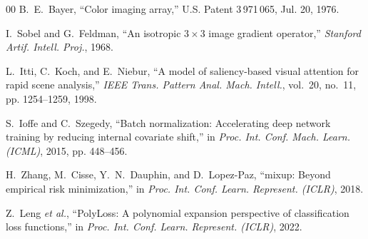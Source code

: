 \documentclass[conference]{IEEEtran}
\begin{document}
\begin{thebibliography}{00}
B.~E.~Bayer, ``Color imaging array,'' U.S. Patent 3\,971\,065, Jul. 20, 1976.

I.~Sobel and G.~Feldman, ``An isotropic $3\times3$ image gradient operator,'' \emph{Stanford Artif. Intell. Proj.}, 1968.

L.~Itti, C.~Koch, and E.~Niebur, ``A model of saliency-based visual attention for rapid scene analysis,'' \emph{IEEE Trans. Pattern Anal. Mach. Intell.}, vol.~20, no.~11, pp. 1254--1259, 1998.

S.~Ioffe and C.~Szegedy, ``Batch normalization: Accelerating deep network training by reducing internal covariate shift,'' in \emph{Proc. Int. Conf. Mach. Learn. (ICML)}, 2015, pp. 448--456.

H.~Zhang, M.~Cisse, Y.~N.~Dauphin, and D.~Lopez-Paz, ``mixup: Beyond empirical risk minimization,'' in \emph{Proc. Int. Conf. Learn. Represent. (ICLR)}, 2018.

Z.~Leng \emph{et al.}, ``{PolyLoss}: A polynomial expansion perspective of classification loss functions,'' in \emph{Proc. Int. Conf. Learn. Represent. (ICLR)}, 2022.

\end{thebibliography}
\endgroup
\end{document}
